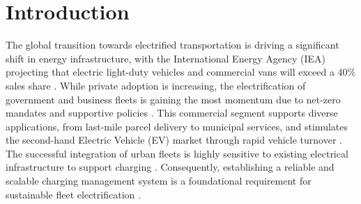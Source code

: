 \documentclass[final,3p,times,twocolumn]{elsarticle}
\begin{document}
\section{Introduction}
\label{sec:intro}

The global transition towards electrified transportation is driving a significant shift in energy infrastructure, with the International Energy Agency (IEA) projecting that electric light-duty vehicles and commercial vans will exceed a 40\% sales share \cite{iea2025global,nimalsiri2021phd}. While private adoption is increasing, the electrification of government and business fleets is gaining the most momentum due to net-zero mandates and supportive policies \cite{alhanahi2024charging}. This commercial segment supports diverse applications, from last-mile parcel delivery to municipal services, and stimulates the second-hand Electric Vehicle (EV) market through rapid vehicle turnover \cite{alhanahi2024charging,uddin2024charging}. The successful integration of urban fleets is highly sensitive to existing electrical infrastructure to support charging \cite{corsetti2024commercial,pozzi2022stochastic}. Consequently, establishing a reliable and scalable charging management system is a foundational requirement for sustainable fleet electrification \cite{varma2026electric}.
\end{document}
